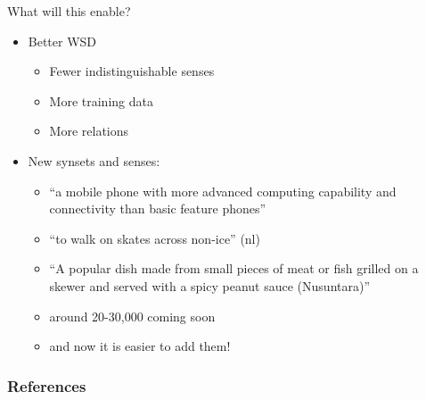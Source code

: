 \documentclass{beamer}
\begin{document}
\begin{frame}{What will this enable?}

  \begin{itemize}
  \item Better WSD
    \begin{itemize}
    \item Fewer indistinguishable senses
    \item More training data
    \item More relations
    \end{itemize}
  \item New synsets and senses:
    \begin{itemize}
    \item {} ``a mobile phone with more advanced computing capability and connectivity than basic feature phones''
    \item {} ``to walk on skates across non-ice'' (nl)
    \item {} ``A popular dish made from small pieces of meat or fish grilled on a skewer and served with a spicy peanut sauce (Nusuntara)''
    \item around 20-30,000 coming soon
    \item[\ldots] and now it is easier to add them!
    \end{itemize}
  \end{itemize}
\end{frame}



  




\begin{frame}[allowframebreaks]
        \frametitle{References}
        
        
\end{frame}
\end{document}

